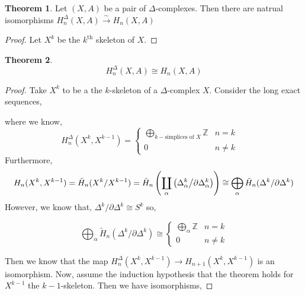 \documentclass[12pt]{extarticle}
\newcommand{\Z}{\mathbb{Z}}
\theoremstyle{definition}
\newtheorem{theorem}{Theorem}[section]
\begin{document}
\begin{theorem}
Let $(X, A)$ be a pair of $\Delta$-complexes. Then there are natrual isomorphisms $H_n^\Delta(X, A) \xrightarrow{\sim} H_n(X, A)$
\end{theorem}

\begin{proof}
Let $X^k$ be the $k^{\mathrm{th}}$ skeleton of $X$. 
\end{proof}


\begin{theorem}
\[ H^{\Delta}_n(X, A) \cong H_n(X, A) \]
\end{theorem}

\begin{proof}
Take $X^k$ to be a the $k$-skeleton of a $\Delta$-complex $X$. Consider the long exact sequences,
\begin{center}
\end{center}
where we know,
\[ H_n^\Delta(X^k, X^{k-1}) = 
\begin{cases}
\bigoplus\limits_{k-\text{simplices of } X} \Z & n = k \quad  \\
0 & n \neq k
\end{cases}\]
Furthermore,
\[ H_n(X^k, X^{k-1}) = \tilde{H}_n(X^k/X^{k-1}) = \tilde{H}_n\left( \coprod_{\alpha} \left( \Delta^k_\alpha \middle/ \partial \Delta_{\alpha}^k \right) \right) \cong \bigoplus_{\alpha} \tilde{H}_n(\Delta^k / \partial \Delta^k) \]
However, we know that, $\Delta^k / \partial \Delta^k \cong S^k$ so,

\[ \bigoplus_{\alpha} \tilde{H}_n(\Delta^k / \partial \Delta^k) \cong \begin{cases}
\bigoplus\limits_{\alpha} \Z & n = k \\
0 & n \neq k
\end{cases} \]
 
Then we know that the map $H_{n}^\Delta(X^k, X^{k-1}) \to H_{n+1}(X^k, X^{k-1})$ is an isomorphism. Now, assume the induction hypothesis that the theorem holds for $X^{k-1}$ the $k-1$-skeleton. Then we have isomorphisms,


\end{proof}
\end{document}
